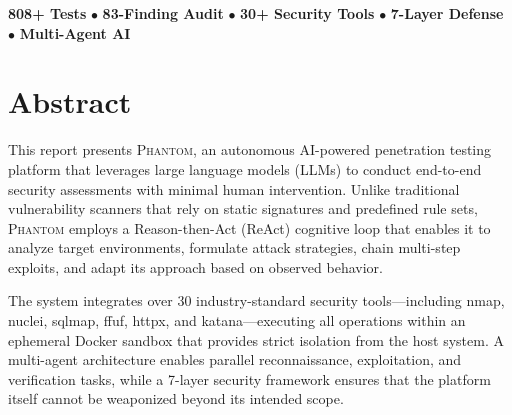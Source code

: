 \documentclass[12pt,a4paper,twoside]{report}
\makeatletter
\newcommand{\phantom@}{\textsc{Phantom}}
\makeatother
\begin{document}
\begin{titlepage}
\vfill

\begin{tcolorbox}[
    enhanced,
    colback=phantomdark!5,
    colframe=phantomdark!30,
    arc=3pt,
    boxrule=0.5pt,
    width=0.9\textwidth,
    halign=center,
]
\small
\textcolor{phantom}{\bfseries 808+ Tests} \quad$\bullet$\quad
\textcolor{phantomred}{\bfseries 83-Finding Audit} \quad$\bullet$\quad
\textcolor{phantomblue}{\bfseries 30+ Security Tools} \quad$\bullet$\quad
\textcolor{phantomgreen}{\bfseries 7-Layer Defense} \quad$\bullet$\quad
\textcolor{phantomorange}{\bfseries Multi-Agent AI}
\end{tcolorbox}

\end{titlepage}

\setcounter{page}{2}

\tableofcontents
\newpage
\listoffigures
\listoftables
\newpage

\chapter*{Abstract}

This report presents \phantom@{}, an autonomous AI-powered penetration testing platform that leverages large language models (LLMs) to conduct end-to-end security assessments with minimal human intervention. Unlike traditional vulnerability scanners that rely on static signatures and predefined rule sets, \phantom@{} employs a Reason-then-Act (ReAct) cognitive loop that enables it to analyze target environments, formulate attack strategies, chain multi-step exploits, and adapt its approach based on observed behavior.

The system integrates over 30 industry-standard security tools---including nmap, nuclei, sqlmap, ffuf, httpx, and katana---executing all operations within an ephemeral Docker sandbox that provides strict isolation from the host system. A multi-agent architecture enables parallel reconnaissance, exploitation, and verification tasks, while a 7-layer security framework ensures that the platform itself cannot be weaponized beyond its intended scope.
\end{document}
